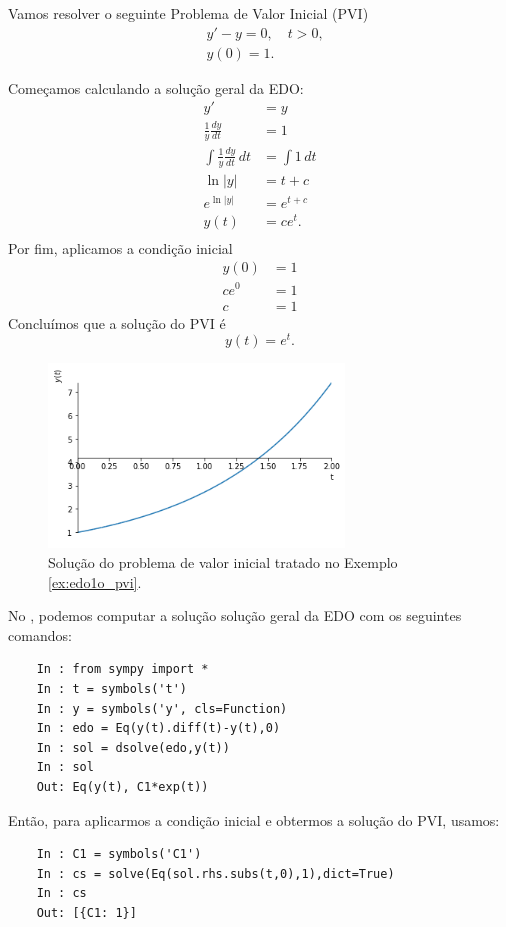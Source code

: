 \begin{ex}\label{ex:edo1o_pvi}
  Vamos resolver o seguinte Problema de Valor Inicial (PVI)
  \begin{align}
    &y' - y = 0, \quad t>0,\\
    &y(0) = 1.
  \end{align}
  
  Começamos calculando a solução geral da EDO:
  \begin{align}
    y' &= y\\
    \frac{1}{y}\frac{dy}{dt} &= 1 \\
    \int \frac{1}{y}\frac{dy}{dt}\,dt &= \int 1\,dt \\
    \ln|y| &= t + c \\
    e^{\ln|y|} &= e^{t+c}\\
    y(t) &= ce^{t}.\\
  \end{align}
  Por fim, aplicamos a condição inicial
  \begin{align}
    y(0) &= 1 \\
    ce^{0} &= 1 \\
    c &= 1
  \end{align}
  Concluímos que a solução do PVI é
  \begin{equation}
    y(t) = e^{t}.
  \end{equation}

  \begin{figure}[H]
    \centering
    \includegraphics[width=0.7\textwidth]{cap_edo1ordem/dados/fig_ex_edo1o_pvi/fig_ex_edo1o_pvi}
    \caption{Solução do problema de valor inicial tratado no Exemplo \ref{ex:edo1o_pvi}.}
    \label{fig:ex_edo1o_pvi}
  \end{figure}

  \ifispython
  No \python, podemos computar a solução solução geral da EDO com os seguintes comandos:
  \begin{lstlisting}
    In : from sympy import *
    In : t = symbols('t')
    In : y = symbols('y', cls=Function)
    In : edo = Eq(y(t).diff(t)-y(t),0)
    In : sol = dsolve(edo,y(t))
    In : sol
    Out: Eq(y(t), C1*exp(t))
  \end{lstlisting}
  Então, para aplicarmos a condição inicial e obtermos a solução do PVI, usamos:
  \begin{lstlisting}
    In : C1 = symbols('C1')
    In : cs = solve(Eq(sol.rhs.subs(t,0),1),dict=True)
    In : cs
    Out: [{C1: 1}]
    

\end{lstlisting}
\end{ex}
